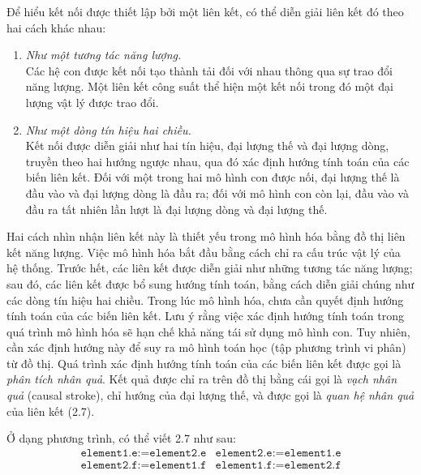 Để hiểu kết nối được thiết lập bởi một liên kết, có thể diễn giải liên kết đó theo hai cách khác nhau:
\begin{enumerate}
\item \emph{Như một tương tác năng lượng.}\\
Các hệ con được kết nối tạo thành tải đối với nhau thông qua sự trao đổi năng lượng. Một liên kết công suất thể hiện một kết nối trong đó một đại lượng vật lý được trao đổi.
\item \emph{Như một dòng tín hiệu hai chiều.}\\
Kết nối được diễn giải như hai tín hiệu, đại lượng thế và đại lượng dòng, truyền theo hai hướng ngược nhau, qua đó xác định hướng tính toán của các biến liên kết. Đối với một trong hai mô hình con được nối, đại lượng thế là đầu vào và đại lượng dòng là đầu ra; đối với mô hình con còn lại, đầu vào và đầu ra tất nhiên lần lượt là đại lượng dòng và đại lượng thế.
\end{enumerate}

Hai cách nhìn nhận liên kết này là thiết yếu trong mô hình hóa bằng đồ thị liên kết năng lượng. Việc mô hình hóa bắt đầu bằng cách chỉ ra cấu trúc vật lý của hệ thống. Trước hết, các liên kết được diễn giải như những tương tác năng lượng; sau đó, các liên kết được bổ sung hướng tính toán, bằng cách diễn giải chúng như các dòng tín hiệu hai chiều. Trong lúc mô hình hóa, chưa cần quyết định hướng tính toán của các biến liên kết. Lưu ý rằng việc xác định hướng tính toán trong quá trình mô hình hóa sẽ hạn chế khả năng tái sử dụng mô hình con. Tuy nhiên, cần xác định hướng này để suy ra mô hình toán học (tập phương trình vi phân) từ đồ thị. Quá trình xác định hướng tính toán của các biến liên kết được gọi là \emph{phân tích nhân quả}. Kết quả được chỉ ra trên đồ thị bằng cái gọi là \emph{vạch nhân quả} (causal stroke), chỉ hướng của đại lượng thế, và được gọi là \emph{quan hệ nhân quả} của liên kết (2.7).

Ở dạng phương trình, có thể viết 2.7 như sau:
\[
\begin{array}{ll}
\texttt{element1.e}:=\texttt{element2.e}&\texttt{element2.e}:=\texttt{element1.e}\\
\texttt{element2.f}:=\texttt{element1.f}&\texttt{element1.f}:=\texttt{element2.f}
\end{array}
\]

